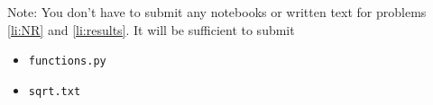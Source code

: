 \documentclass[letterpaper]{scrartcl}
\begin{document}
\noindent
Note: You don't have to submit any notebooks or written
text for problems \ref{li:NR} and \ref{li:results}. It will be sufficient to submit
\begin{itemize}
\item \texttt{functions.py}
\item \texttt{sqrt.txt}
\end{itemize}
\end{document}

